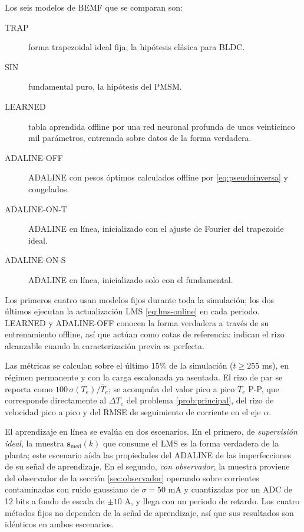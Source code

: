 \documentclass[../../../Tesis_JALS_Maestria.tex]{subfiles}
\begin{document}
Los seis modelos de BEMF que se comparan son:
\begin{description}
    \item[TRAP] forma trapezoidal ideal fija, la hipótesis clásica para BLDC.
    \item[SIN] fundamental puro, la hipótesis del PMSM.
    \item[LEARNED] tabla aprendida offline por una red neuronal profunda de unos veinticinco mil parámetros, entrenada sobre datos de la forma verdadera.
    \item[ADALINE-OFF] ADALINE con pesos óptimos calculados offline por \eqref{eq:pseudoinversa} y congelados.
    \item[ADALINE-ON-T] ADALINE en línea, inicializado con el ajuste de Fourier del trapezoide ideal.
    \item[ADALINE-ON-S] ADALINE en línea, inicializado solo con el fundamental.
\end{description}
Los primeros cuatro usan modelos fijos durante toda la simulación; los dos últimos ejecutan la actualización LMS \eqref{eq:lms-online} en cada periodo. LEARNED y ADALINE-OFF conocen la forma verdadera a través de su entrenamiento offline, así que actúan como cotas de referencia: indican el rizo alcanzable cuando la caracterización previa es perfecta.

Las métricas se calculan sobre el último $15\%$ de la simulación ($t \ge 255$ ms), en régimen permanente y con la carga escalonada ya asentada. El rizo de par se reporta como $100\,\sigma(T_e)/\bar{T}_e$; se acompaña del valor pico a pico $T_e$ P-P, que corresponde directamente al $\Delta T_e$ del problema \ref{prob:principal}, del rizo de velocidad pico a pico y del RMSE de seguimiento de corriente en el eje $\alpha$.

El aprendizaje en línea se evalúa en dos escenarios. En el primero, de \emph{supervisión ideal}, la muestra $\mathbf{s}_\mathrm{med}(k)$ que consume el LMS es la forma verdadera de la planta; este escenario aísla las propiedades del ADALINE de las imperfecciones de su señal de aprendizaje. En el segundo, \emph{con observador}, la muestra proviene del observador de la sección \ref{sec:observador} operando sobre corrientes contaminadas con ruido gaussiano de $\sigma = 50$ mA y cuantizadas por un ADC de 12 bits a fondo de escala de $\pm 10$ A, y llega con un periodo de retardo. Los cuatro métodos fijos no dependen de la señal de aprendizaje, así que sus resultados son idénticos en ambos escenarios.

\end{document}

